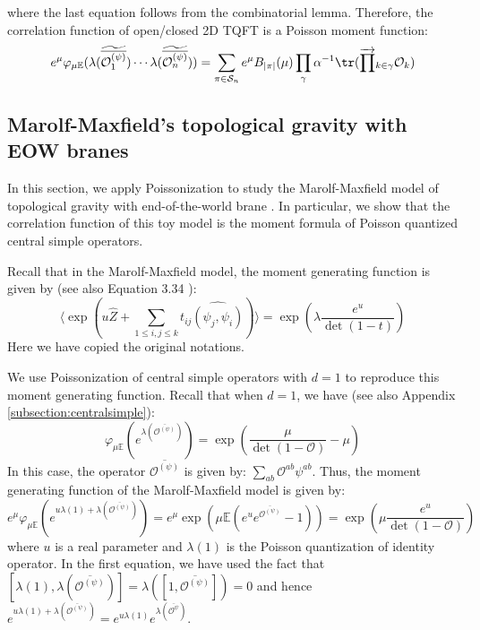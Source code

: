 \documentclass[a4paper,11pt]{article}
\theoremstyle{definition}
\numberwithin{equation}{section}
\begin{document}
where the last equation follows from the combinatorial lemma. Therefore, the correlation function of open/closed 2D TQFT is a Poisson moment function:
\begin{equation}
    e^\mu\varphi_{\mu\mathbb{E}}(\lambda(\widetilde{\overline{\mathcal{O}_1^{(\psi)}}})\cdots\lambda(\widetilde{\overline{\mathcal{O}_n^{(\psi)}}})) = \sum_{\pi\in\mathcal{S}_n}e^\mu B_{|\pi|}(\mu)\prod_{\gamma}\alpha^{-1}\tr(\overrightarrow{\prod}_{k\in \gamma}\mathcal{O}_k)
\end{equation}
\subsection{Marolf-Maxfield's topological gravity with EOW branes}\label{subsection:MMEOWdetail}

In this section, we apply Poissonization to study the Marolf-Maxfield model of topological gravity with end-of-the-world brane \cite{MM}. In particular, we show that the correlation function of this toy model is the moment formula of Poisson quantized central simple operators.

Recall that in the Marolf-Maxfield model, the moment generating function is given by (see also Equation 3.34 \cite{MM}):
\begin{equation}\label{equation:MMkey}
    \langle\exp(u\widehat{Z} + \sum_{1\leq i,j \leq k}t_{ij}\widehat{(\psi_j, \psi_i)})\rangle = \exp(\lambda\frac{e^u}{\det(1 - t)})
\end{equation}
Here we have copied the original notations.

We use Poissonization of central simple operators with $d = 1$ to reproduce this moment generating function. Recall that when $d = 1$, we have (see also Appendix \ref{subsection:centralsimple}):
\begin{equation}
    \varphi_{\mu\mathbb{E}}(e^{\lambda(\overline{\mathcal{O}^{(\psi)}})}) = \exp(\frac{\mu}{\det(1 - \mathcal{O})}-\mu)
\end{equation}
In this case, the operator $\overline{\mathcal{O}^{(\psi)}}$ is given by: $\sum_{ab}\mathcal{O}^{ab}\psi^{ab}$. Thus, the moment generating function of the Marolf-Maxfield model is given by:
\begin{equation}
    e^\mu\varphi_{\mu\mathbb{E}}(e^{u\lambda(1) + \lambda(\overline{\mathcal{O}^{(\psi)}})}) = e^\mu\exp(\mu\mathbb{E}(e^ue^{\overline{\mathcal{O}^{(\psi)}}} - 1)) =  \exp(\mu\frac{e^u}{\det(1 - \mathcal{O})})
\end{equation}
where $u$ is a real parameter and $\lambda(1)$ is the Poisson quantization of identity operator. In the first equation, we have used the fact that $[\lambda(1), \lambda(\overline{\mathcal{O}^{(\psi)}})] = \lambda([1, \overline{\mathcal{O}^{(\psi)}}]) = 0$ and hence $e^{u\lambda(1) + \lambda(\overline{\mathcal{O}^{(\psi)}})} = e^{u\lambda(1)}e^{\lambda(\overline{\mathcal{O}^{\psi}})}$.
\end{document}
